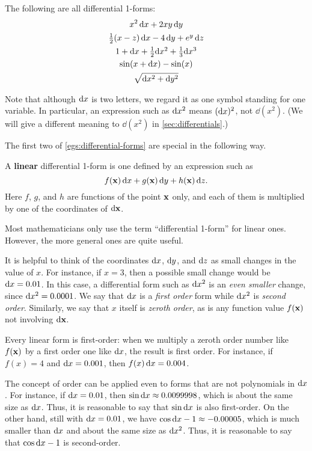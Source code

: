 \documentclass[12pt]{amsart}
\begin{document}
\begin{egs}\label{egs:differential-forms}
  The following are all differential 1-forms:
  \begin{gather*}
    x^2 \,\mathrm{d} x + 2xy \, \mathrm{d} y\\
    \textstyle\frac{1}{2}({x-z}) \,\mathrm{d} x - 4\, \mathrm{d} y + e^y \,\mathrm{d} z\\
    1 + \mathrm{d} x + \textstyle\frac{1}{2} \mathrm{d} x^2 + \textstyle\frac{1}{3} \mathrm{d} x^3\\
    \sin(x + \mathrm{d} x) - \sin(x)\\
    \sqrt{\mathrm{d} x^2+\mathrm{d} y^2}
  \end{gather*}
\end{egs}

Note that although $\mathrm{d} x$ is two letters, we regard it as one symbol standing for one variable.
In particular, an expression such as $\mathrm{d} x^2$ means $(\mathrm{d} x)^2$, not $\dd(x^2)$.
(We will give a different meaning to $\dd(x^2)$ in \cref{sec:differentials}.)

The first two of \cref{egs:differential-forms} are special in the following way.

\begin{defn}
  A \textbf{linear} differential 1-form is one defined by an expression such as
  \[ f(\mathbf{x}) \, \mathrm{d} x + g(\mathbf{x}) \, \mathrm{d} y + h(\mathbf{x}) \, \mathrm{d} z. \]
  Here $f$, $g$, and $h$ are functions of the point $\mathbf{x}$ only, and each of them is multiplied by one of the coordinates of $\mathrm{d} \mathbf{x}$.
\end{defn}

Most mathematicians only use the term ``differential 1-form'' for linear ones.
However, the more general ones are quite useful.

It is helpful to think of the coordinates $\mathrm{d} x$, $\mathrm{d} y$, and $\mathrm{d} z$ as small changes in the value of $x$.
For instance, if $x=3$, then a possible small change would be $\mathrm{d} x = 0.01$.
In this case, a differential form such as $\mathrm{d} x^2$ is an \emph{even smaller} change, since $\mathrm{d} x^2 = 0.0001$.
We say that $\mathrm{d} x$ is a \emph{first order} form while $\mathrm{d} x^2$ is \emph{second order}.
Similarly, we say that $x$ itself is \emph{zeroth order}, as is any function value $f(\mathbf{x})$ not involving $\mathrm{d} \mathbf{x}$.

Every linear form is first-order: when we multiply a zeroth order number like $f(\mathbf{x})$ by a first order one like $\mathrm{d} x$, the result is first order.
For instance, if $f(x) = 4$ and $\mathrm{d} x = 0.001$, then $f(x)\,\mathrm{d} x = 0.004$.

The concept of order can be applied even to forms that are not polynomials in $\mathrm{d} x$.
For instance, if $\mathrm{d} x=0.01$, then $\sin \mathrm{d} x \approx 0.0099998$, which is about the same size as $\mathrm{d} x$.
Thus, it is reasonable to say that $\sin\mathrm{d} x$ is also first-order.
On the other hand, still with $\mathrm{d} x=0.01$, we have $\cos \mathrm{d} x - 1 \approx -0.00005$, which is much smaller than $\mathrm{d} x$ and about the same size as $\mathrm{d} x^2$.
Thus, it is reasonable to say that $\cos \mathrm{d} x - 1$ is second-order.
\end{document}
